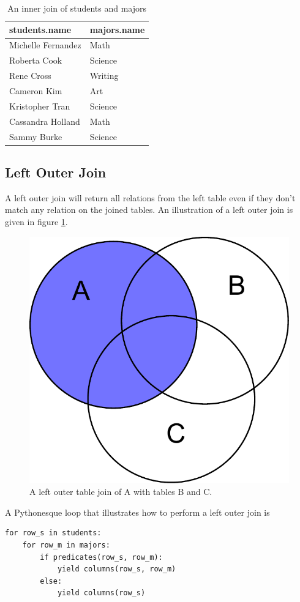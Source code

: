 \begin{table}
\begin{tabular}{|l|l|}
\hline
students.name & majors.name \\
\hline
Michelle Fernandez & Math \\
Roberta Cook & Science \\
Rene Cross & Writing \\
Cameron Kim & Art \\
Kristopher Tran & Science \\
Cassandra Holland & Math \\
Sammy Burke & Science \\
\hline
\end{tabular}
\caption{An inner join of students and majors}
\label{table:ij_studentsmajors}
\end{table}

\subsection*{Left Outer Join}
A left outer join will return all relations from the left table even if they don't match any relation on the joined tables.
An illustration of a left outer join is given in figure \ref{fig:left_outer}.
\begin{figure}
\centering
\includegraphics[width=.5\textwidth]{figures/left_outer.pdf}
\caption{A left outer table join of A with tables B and C.}
\label{fig:left_outer}
\end{figure}

A Pythonesque loop that illustrates how to perform a left outer join is
\begin{lstlisting}
for row_s in students:
    for row_m in majors:
        if predicates(row_s, row_m):
            yield columns(row_s, row_m)
        else:
            yield columns(row_s)
\end{lstlisting}

